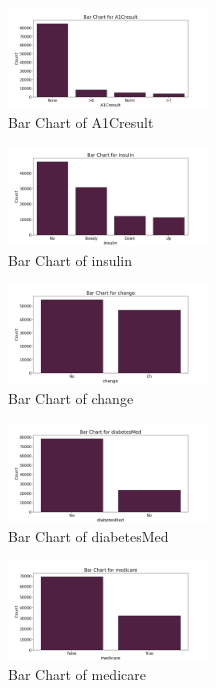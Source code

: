 \documentclass{article}%
\begin{document}
%


\begin{figure}[h!]%
\centering%
\includegraphics[width=200px]{eda/bar_charts/A1Cresult_bar_chart.png}%
\caption{Bar Chart of A1Cresult}%
\end{figure}

%


\begin{figure}[h!]%
\centering%
\includegraphics[width=200px]{eda/bar_charts/insulin_bar_chart.png}%
\caption{Bar Chart of insulin}%
\end{figure}

%


\begin{figure}[h!]%
\centering%
\includegraphics[width=200px]{eda/bar_charts/change_bar_chart.png}%
\caption{Bar Chart of change}%
\end{figure}

%


\begin{figure}[h!]%
\centering%
\includegraphics[width=200px]{eda/bar_charts/diabetesMed_bar_chart.png}%
\caption{Bar Chart of diabetesMed}%
\end{figure}

%


\begin{figure}[h!]%
\centering%
\includegraphics[width=200px]{eda/bar_charts/medicare_bar_chart.png}%
\caption{Bar Chart of medicare}%
\end{figure}
\end{document}
